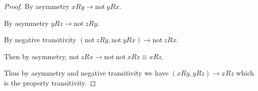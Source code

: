 \documentclass[a4paper, 12pt]{config/homework}
\begin{document}
\begin{enumerate}
\begin{proof}
By asymmetry \(xRy \rightarrow \text{not}\ yRx\).

By asymmetry \(yRz \rightarrow \text{not}\ zRy\).

By negative transitivity \((\text{not}\ zRy, \text{not}\ yRx) \rightarrow \text{not}\ zRx\).

Then by asymmetry, \(\text{not}\ zRx \to \text{not}\ \text{not}\ xRz \equiv xRz\).

Thus by asymmetry and negative transitivity we have \((xRy, yRz) \to xRz\) which is the property transitivity.
\end{proof}

\end{enumerate}
\end{document}
